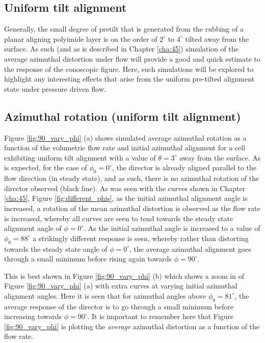 \subsection{Uniform tilt alignment}
Generally, the small degree of pretilt that is generated from the rubbing of a planar aligning polyimide layer is on the order of $2^{\circ}$ to $4^{\circ}$ tilted away from the surface. As such (and as is described in Chapter \ref{cha:45}) simulation of the average azimuthal distortion under flow will provide a good and quick estimate to the response of the conoscopic figure. Here, such simulations will be explored to highlight any interesting effects that arise from the uniform pre-tilted alignment state under pressure driven flow.

\subsection{Azimuthal rotation (uniform tilt alignment)}
Figure \ref{fig:90_vary_phi} (a) shows simulated average azimuthal rotation as a function of the volumetric flow rate and initial azimuthal alignment for a cell exhibiting uniform tilt alignment with a value of $\theta=3^{\circ}$ away from the surface. As is expected, for the case of $\phi_0=0^{\circ}$, the director is already aligned parallel to the flow direction (in steady state), and as such, there is no azimuthal rotation of the director observed (black line). As was seen with the curves shown in Chapter \ref{cha:45}, Figure \ref{fig:different_phis}, as the initial azimuthal alignment angle is increased, a rotation of the mean azimuthal distortion is observed as the flow rate is increased, whereby all curves are seen to tend towards the steady state alignment angle of $\phi=0^{\circ}$. As the initial azimuthal angle is increased to a value of $\phi_0=88^{\circ}$ a strikingly different response is seen, whereby rather than distorting towards the steady state angle of $\phi=0^{\circ}$, the average azimuthal alignment goes through a small minimum before rising again towards $\phi=90^{\circ}$. 

This is best shown in Figure \ref{fig:90_vary_phi} (b) which shows a zoom in of Figure \ref{fig:90_vary_phi} (a) with extra curves at varying initial azimuthal alignment angles. Here it is seen that for azimuthal angles above $\phi_0=81^{\circ}$, the average response of the director is to go through a small minimum before increasing towards $\phi=90^{\circ}$. It is important to remember here that Figure \ref{fig:90_vary_phi} is plotting the \textit{average} azimuthal distortion as a function of the flow rate.

